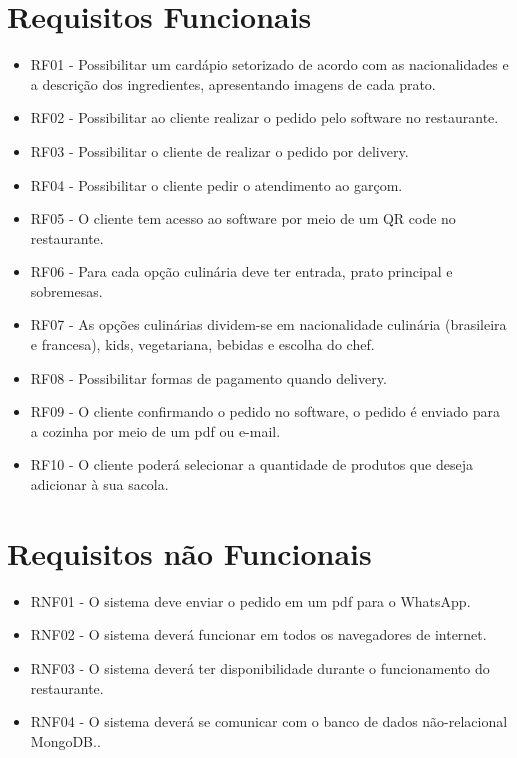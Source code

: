 \documentclass[12pt, a4paper]{article}
\begin{document}
  \section{Requisitos Funcionais}
  \begin{itemize}
  	\item RF01 - Possibilitar um cardápio setorizado de acordo com as nacionalidades e a descrição dos ingredientes, apresentando imagens de cada prato.
  	
  	\item RF02 - Possibilitar ao cliente realizar o pedido pelo software no restaurante.
  	
  	\item RF03 - Possibilitar o cliente de realizar o pedido por delivery.
  	
  	\item RF04 - Possibilitar o cliente pedir o atendimento ao garçom.
  	
  	\item RF05 - O cliente tem acesso ao software por meio de um QR code no restaurante.
  	
  	\item RF06 - Para cada opção culinária deve ter entrada, prato principal e sobremesas.
  	
  	\item RF07 -  As opções culinárias dividem-se em nacionalidade culinária (brasileira e francesa), kids, vegetariana, bebidas e escolha do chef.
  	
  	\item RF08 - Possibilitar formas de pagamento quando delivery.
  	
  	\item RF09 - O cliente confirmando o pedido no software, o pedido é enviado para a cozinha por meio de um pdf ou e-mail.
  	
  	\item RF10 - O cliente poderá selecionar a quantidade de produtos que deseja adicionar à sua sacola.
  \end{itemize}

\section{Requisitos não Funcionais}
  \begin{itemize}
		\item RNF01 - O sistema deve enviar o pedido em um pdf para o WhatsApp.
		
		\item RNF02 - O sistema deverá funcionar em todos os navegadores de internet.
		
		\item RNF03 - O sistema deverá ter disponibilidade durante o funcionamento do restaurante.
		
		\item RNF04 -  O sistema deverá se comunicar com o banco de dados não-relacional MongoDB..
  \end{itemize}
\end{document}
